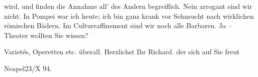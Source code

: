                wird, und finden die Annahme all’ des Andern begreiflich. Nein arrogant sind wir
               nicht. In Pompei war ich heute; ich bin ganz krank  vor
               Sehnsucht nach {\pb}wirklichen römischen Bädern. Im Culturraffinement sind wir
               noch alle Barbaren. Ja – Theater wollten Sie wissen?\pend
           \settowidth{\longeste}{}\settowidth{\longestz}{}\settowidth{\longestd}{}\settowidth{\longestv}{}\settowidth{\longestf}{}\addtolength\longeste{1em}
        \addtolength\longestz{1em}
      \settowidth{\longeste}{}\settowidth{\longestz}{}\settowidth{\longestd}{}\settowidth{\longestv}{}\settowidth{\longestf}{}\addtolength\longeste{1em}
        \addtolength\longestz{1em}
      
\pstart
           Varietés, Operetten etc. überall.\pend
           \pstart Herzlichst Ihr \spacefill\mbox{Richard.}\pend{}
\pstart
           \noindent{}der sich auf Sie freut\pend
           
\pstart
           \raggedleft{}Neapel23/X 94.\pend
           \endnumbering{}  
      